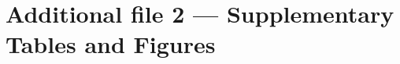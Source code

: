 \documentclass{bmcart}
\begin{document}


\section*{Additional file 2 --- Supplementary Tables and Figures}
\end{document}
